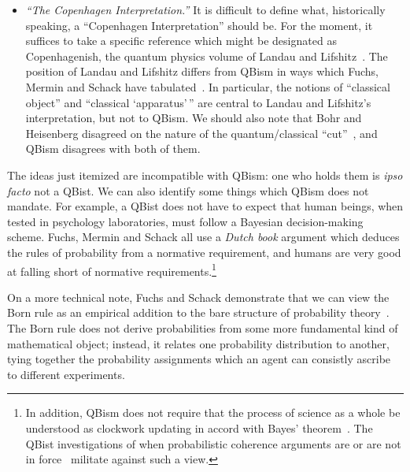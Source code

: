 \documentclass[aps,pra,superscriptaddress,12pt,tightenlines,nofootinbib]{revtex4-2}
\begin{document}
\begin{itemize}
\item \emph{``The Copenhagen Interpretation.''}  It is difficult to
  define what, historically speaking, a ``Copenhagen Interpretation''
  should be.  For the moment, it suffices to take a specific reference
  which might be designated as Copenhagenish, the quantum physics
  volume of Landau and Lifshitz~\cite{Landau1991}.  The position of
  Landau and Lifshitz differs from QBism in ways which Fuchs, Mermin
  and Schack have tabulated~\cite{AJP, Mermin-Vienna, Mermin-Bell}.
  In particular, the notions of ``classical object'' and ``classical
  `apparatus'\,'' are central to Landau and Lifshitz's interpretation,
  but not to QBism.  We should also note that Bohr and Heisenberg
  disagreed on the nature of the quantum/classical
  ``cut''~\cite{Camilleri2015}, and QBism disagrees with both of them.
\end{itemize}

The ideas just itemized are incompatible with QBism: one who holds
them is \emph{ipso facto} not a QBist.  We can also identify some
things which QBism does not mandate.  For example, a QBist does not
have to expect that human beings, when tested in psychology
laboratories, must follow a Bayesian decision-making scheme.  Fuchs,
Mermin and Schack all use a \emph{Dutch book} argument which deduces
the rules of probability from a normative requirement, and humans are
very good at falling short of normative requirements.\footnote{In
  addition, QBism does not require that the process of science as a
  whole be understood as clockwork updating in accord with Bayes'
  theorem~\cite[pp.\ 193, 500, 799, 1020, 1228, 1731]{Fuchs2014}.  The
  QBist investigations of when probabilistic coherence arguments are
  or are not in force~\cite{FuchsSchack2011, RMP} militate against
  such a view.}

On a more technical note, Fuchs and Schack demonstrate that we can
view the Born rule as an empirical addition to the bare structure of
probability theory~\cite{RMP}.  The Born rule does not derive
probabilities from some more fundamental kind of mathematical object;
instead, it relates one probability distribution to another, tying
together the probability assignments which an agent can consistly
ascribe to different experiments.
\end{document}
